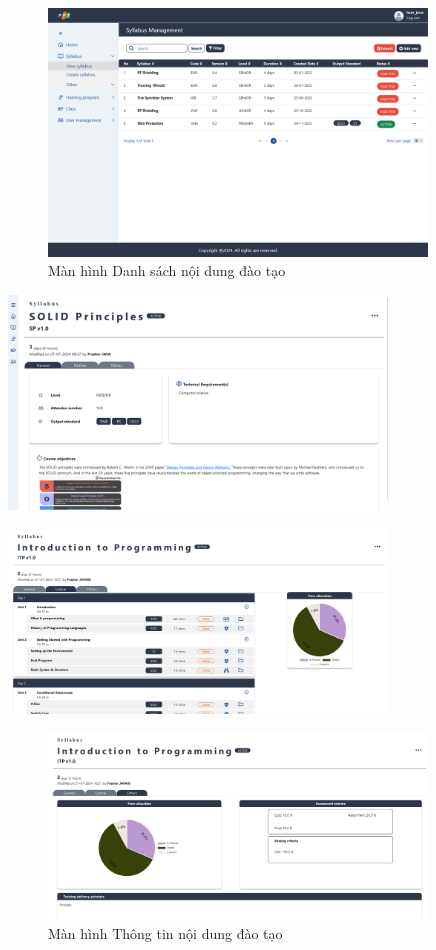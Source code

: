 \documentclass[report.tex]{subfiles}
\begin{document}
\begin{figure}[!htb]
{\centering
\includegraphics[width=380px]{../meta/ui.syllabus-list.png}
\caption{Màn hình Danh sách nội dung đào tạo}
\par
}
\end{figure}
\FloatBarrier

{\centering
\includegraphics[width=380px]{../meta/ui.syllabus-detail-1.png}
\par
}
{\centering
\includegraphics[width=380px]{../meta/ui.syllabus-detail-2.png}
\par
}
\begin{figure}[!htb]
{\centering
\includegraphics[width=380px]{../meta/ui.syllabus-detail-3.png}
\caption{Màn hình Thông tin nội dung đào tạo}
\par
}
\end{figure}
\FloatBarrier
\end{document}
